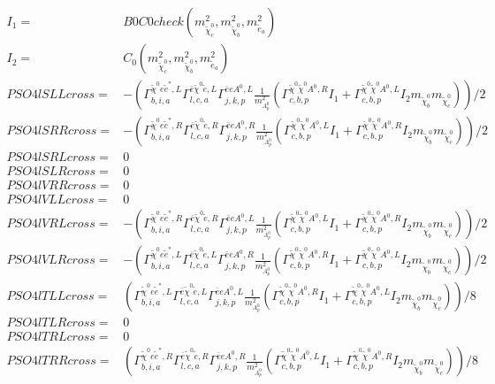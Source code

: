 \documentclass[A4,landscape]{article}
\begin{document}
\begin{align} 
I_1= & B0C0check(m^2_{\tilde{\chi}^0_{{c}}}, m^2_{\tilde{\chi}^0_{{b}}}, m^2_{\tilde{e}_{{a}}}) \\ 
I_2= & C_0(m^2_{\tilde{\chi}^0_{{c}}}, m^2_{\tilde{\chi}^0_{{b}}}, m^2_{\tilde{e}_{{a}}}) \\ 
  PSO4lSLLcross= & -( \Gamma^{\tilde{\chi}^0 e \tilde{e}^*,L}_{b, i, a} \Gamma^{\bar{e}\tilde{\chi}^0 \tilde{e} ,L}_{l, c, a} \Gamma^{\bar{e}e A^0 ,L}_{j, k, p} \frac{1}{m^2_{A^0_{{p}}}} (\Gamma^{\tilde{\chi}^0 \tilde{\chi}^0 A^0 ,R}_{c, b, p} I_1 + \Gamma^{\tilde{\chi}^0 \tilde{\chi}^0 A^0 ,L}_{c, b, p} I_2 m_{\tilde{\chi}^0_{{b}}} m_{\tilde{\chi}^0_{{c}}}))/2 \\ 
  PSO4lSRRcross= & -( \Gamma^{\tilde{\chi}^0 e \tilde{e}^*,R}_{b, i, a} \Gamma^{\bar{e}\tilde{\chi}^0 \tilde{e} ,R}_{l, c, a} \Gamma^{\bar{e}e A^0 ,R}_{j, k, p} \frac{1}{m^2_{A^0_{{p}}}} (\Gamma^{\tilde{\chi}^0 \tilde{\chi}^0 A^0 ,L}_{c, b, p} I_1 + \Gamma^{\tilde{\chi}^0 \tilde{\chi}^0 A^0 ,R}_{c, b, p} I_2 m_{\tilde{\chi}^0_{{b}}} m_{\tilde{\chi}^0_{{c}}}))/2 \\ 
  PSO4lSRLcross= & 0 \\ 
  PSO4lSLRcross= & 0 \\ 
  PSO4lVRRcross= & 0 \\ 
  PSO4lVLLcross= & 0 \\ 
  PSO4lVRLcross= & -( \Gamma^{\tilde{\chi}^0 e \tilde{e}^*,R}_{b, i, a} \Gamma^{\bar{e}\tilde{\chi}^0 \tilde{e} ,R}_{l, c, a} \Gamma^{\bar{e}e A^0 ,L}_{j, k, p} \frac{1}{m^2_{A^0_{{p}}}} (\Gamma^{\tilde{\chi}^0 \tilde{\chi}^0 A^0 ,L}_{c, b, p} I_1 + \Gamma^{\tilde{\chi}^0 \tilde{\chi}^0 A^0 ,R}_{c, b, p} I_2 m_{\tilde{\chi}^0_{{b}}} m_{\tilde{\chi}^0_{{c}}}))/2 \\ 
  PSO4lVLRcross= & -( \Gamma^{\tilde{\chi}^0 e \tilde{e}^*,L}_{b, i, a} \Gamma^{\bar{e}\tilde{\chi}^0 \tilde{e} ,L}_{l, c, a} \Gamma^{\bar{e}e A^0 ,R}_{j, k, p} \frac{1}{m^2_{A^0_{{p}}}} (\Gamma^{\tilde{\chi}^0 \tilde{\chi}^0 A^0 ,R}_{c, b, p} I_1 + \Gamma^{\tilde{\chi}^0 \tilde{\chi}^0 A^0 ,L}_{c, b, p} I_2 m_{\tilde{\chi}^0_{{b}}} m_{\tilde{\chi}^0_{{c}}}))/2 \\ 
  PSO4lTLLcross= & ( \Gamma^{\tilde{\chi}^0 e \tilde{e}^*,L}_{b, i, a} \Gamma^{\bar{e}\tilde{\chi}^0 \tilde{e} ,L}_{l, c, a} \Gamma^{\bar{e}e A^0 ,L}_{j, k, p} \frac{1}{m^2_{A^0_{{p}}}} (\Gamma^{\tilde{\chi}^0 \tilde{\chi}^0 A^0 ,R}_{c, b, p} I_1 + \Gamma^{\tilde{\chi}^0 \tilde{\chi}^0 A^0 ,L}_{c, b, p} I_2 m_{\tilde{\chi}^0_{{b}}} m_{\tilde{\chi}^0_{{c}}}))/8 \\ 
  PSO4lTLRcross= & 0 \\ 
  PSO4lTRLcross= & 0 \\ 
  PSO4lTRRcross= & ( \Gamma^{\tilde{\chi}^0 e \tilde{e}^*,R}_{b, i, a} \Gamma^{\bar{e}\tilde{\chi}^0 \tilde{e} ,R}_{l, c, a} \Gamma^{\bar{e}e A^0 ,R}_{j, k, p} \frac{1}{m^2_{A^0_{{p}}}} (\Gamma^{\tilde{\chi}^0 \tilde{\chi}^0 A^0 ,L}_{c, b, p} I_1 + \Gamma^{\tilde{\chi}^0 \tilde{\chi}^0 A^0 ,R}_{c, b, p} I_2 m_{\tilde{\chi}^0_{{b}}} m_{\tilde{\chi}^0_{{c}}}))/8 \\ 
\end{align} 
\end{document}
